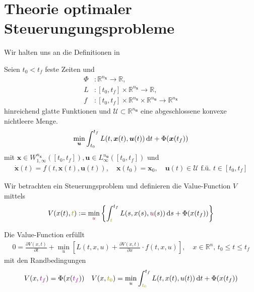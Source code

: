 \documentclass[a4paper, 12pt]{scrartcl}
\newcommand{\lila}[2][lila]{\textcolor{#1}{#2}}
\newcommand{\dunkelrot}[2][dunkelrot]{\textcolor{#1}{#2}}
\newcommand{\dunkelgelb}[2][dunkelgelb]{\textcolor{#1}{#2}}
\newcommand{\dt}{\thinspace \mathrm{d}t}
\newcommand{\ds}{\thinspace \mathrm{d}s}
\begin{document}
\newpage



\section{Theorie optimaler Steuerungungsprobleme}

Wir halten uns an die Definitionen in \cite{gerdts2012}

\begin{definition}
    Seien $t_0<t_f$ feste Zeiten und 
    \begin{align*}
        \Phi &: \mathbb{R}^{n_{\bm{x}}} \to \mathbb{R}, \\
        L &: [t_0,t_f] \times \mathbb{R}^{n_{\bm{x}}}  \to \mathbb{R},  \\
        f &: [t_0,t_f] \times \mathbb{R}^{n_{\bm{x}}} \times \mathbb{R}^{n_{\bm{u}}} 
        \to \mathbb{R}^{n_{\bm{x}}}
    \end{align*}
    hinreichend glatte Funktionen und $\mathcal{U} \subset \mathbb{R}^{n_{\bm{u}}}$ 
    eine abgeschlossene konvexe nichtleere Menge. 
    \begin{align*}
        \min_{\bm{u}} \int_{t_0}^{t_f} L(t,\bm{x}(t),\bm{u}(t)) \dt + \Phi(\bm{x}(t_f))
    \end{align*}
    mit $\bm{x} \in W_{1,\infty}^{n_{\bm{x}}}([t_0,t_f]), 
    \bm{u} \in L_{\infty}^{n_{\bm{u}}}([t_0,t_f])$ und 
    \begin{align*}
        \dot{\bm{x}}(t) = f(t,\bm{x}(t),\bm{u}(t)), \quad \bm{x}(t_0) = \bm{x}_0, \quad \bm{u}(t) \in \mathcal{U} \text{ f.ü. } t \in [t_0,t_f]
    \end{align*}
\end{definition}

Wir betrachten ein Steuerungsproblem und definieren die Value-Function $V$ mittels
%
\begin{align*}
    V(x(t),\dunkelgelb{t}) := \min_{\dunkelrot{u}} \left\{ \int_{\dunkelgelb{t}}^{t_f} L(s,x(s),\dunkelrot{u}(s)) \ds + \Phi(x(t_f)) \right\}
\end{align*}

\begin{satz}
    Die Value-Function erfüllt
    \begin{align*}
        0 = \frac{\partial V(x, t)}{\partial t} 
        + \min_{u} \left[ L(t,x, u) + \frac{\partial V(x,t)}{\partial x} \cdot f(t,x,u) \right], 
        \quad x \in \mathbb{R}^n, \, t_0 \leq t \leq t_f
    \end{align*}
    mit den Randbedingungen
    \begin{align*}
        V(x, \lila{t_f}) = \Phi(x(\lila{t_f})) 
        \quad 
        V(x, \dunkelgelb{t_0} ) = \min_u \int_{\dunkelgelb{t_0}}^{t_f} L(t,x(t),u(t)) \dt + \Phi(x(t_f)) 
    \end{align*}
\end{satz}
\end{document}
